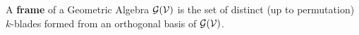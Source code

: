 \begin{definition}
	A \textbf{frame} of a Geometric Algebra $\mathcal{G}(\mathcal{V})$ is the set of distinct (up to permutation) $k$-blades formed from an orthogonal basis of $\mathcal{G}(\mathcal{V})$.
\end{definition}
